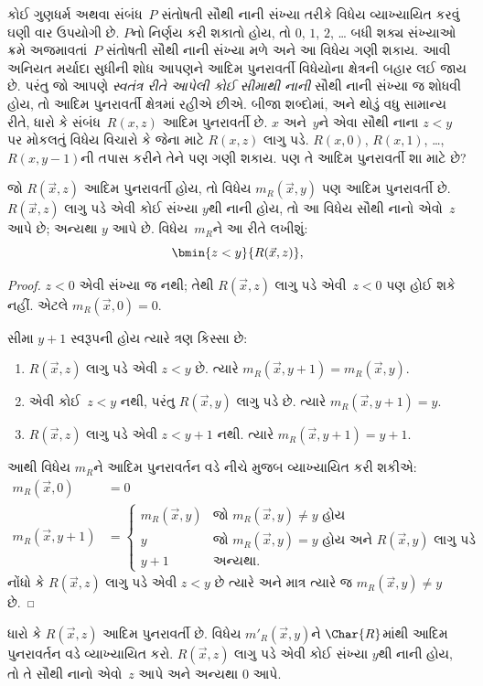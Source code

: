 \documentclass[../../../include/open-logic-section]{subfiles}
\begin{document}

\begin{explain}
કોઈ ગુણધર્મ અથવા સંબંધ~$P$ સંતોષતી સૌથી નાની સંખ્યા તરીકે વિધેય
વ્યાખ્યાયિત કરવું ઘણી વાર ઉપયોગી છે. $P$નો નિર્ણય કરી શકાતો હોય,
તો $0$, $1$, $2$, \dots{} બધી શક્ય સંખ્યાઓ ક્રમે અજમાવતાં~$P$
સંતોષતી સૌથી નાની સંખ્યા મળે અને આ વિધેય ગણી શકાય. આવી અનિયત
મર્યાદા સુધીની શોધ આપણને આદિમ પુનરાવર્તી વિધેયોના ક્ષેત્રની બહાર લઈ
જાય છે. પરંતુ જો આપણે \emph{સ્વતંત્ર રીતે આપેલી કોઈ સીમાથી નાની}
સૌથી નાની સંખ્યા જ શોધવી હોય, તો આદિમ પુનરાવર્તી ક્ષેત્રમાં રહીએ
છીએ. બીજા શબ્દોમાં, અને થોડું વધુ સામાન્ય રીતે, ધારો કે
સંબંધ~$R(x,z)$ આદિમ પુનરાવર્તી છે. $x$ અને~$y$ને એવા સૌથી નાના
$z < y$ પર મોકલતું વિધેય વિચારો કે જેના માટે $R(x, z)$ લાગુ પડે.
$R(x, 0)$, $R(x, 1)$, \dots, $R(x, y-1)$ની તપાસ કરીને તેને પણ
ગણી શકાય. પણ તે આદિમ પુનરાવર્તી શા માટે છે?
\end{explain}

\begin{prop}
જો $R(\vec x, z)$ આદિમ પુનરાવર્તી હોય, તો વિધેય
$m_R(\vec{x}, y)$ પણ આદિમ પુનરાવર્તી છે. $R(\vec x, z)$ લાગુ પડે
એવી કોઈ સંખ્યા $y$થી નાની હોય, તો આ વિધેય સૌથી નાનો એવો~$z$ આપે
છે; અન્યથા $y$ આપે છે. વિધેય~$m_R$ને આ રીતે લખીશું:
\[
\bmin{z < y}{R(\vec{x}, z)},
\]
\end{prop}

\begin{proof}
$z < 0$ એવી સંખ્યા જ નથી; તેથી $R(\vec{x}, z)$ લાગુ પડે
એવી~$z < 0$ પણ હોઈ શકે નહીં. એટલે $m_R(\vec x, 0) = 0$.

સીમા $y + 1$ સ્વરૂપની હોય ત્યારે ત્રણ કિસ્સા છે:
\begin{enumerate}
\item $R(\vec{x}, z)$ લાગુ પડે એવી $z < y$ છે. ત્યારે
$m_R(\vec{x}, y+1) = m_R(\vec{x}, y)$.
\item એવી કોઈ~$z<y$ નથી, પરંતુ $R(\vec{x}, y)$ લાગુ પડે છે.
ત્યારે $m_R(\vec{x}, y+1) = y$.
\item $R(\vec{x}, z)$ લાગુ પડે એવી $z < y+1$ નથી. ત્યારે
$m_R(\vec{x}, y+1) = y+1$.
\end{enumerate}
આથી વિધેય $m_R$ને આદિમ પુનરાવર્તન વડે નીચે મુજબ વ્યાખ્યાયિત
કરી શકીએ:
\begin{align*}
m_R(\vec{x}, 0) & = 0\\
m_R(\vec{x}, y+1) & =
\begin{cases}
m_R(\vec{x}, y) & \text{જો $m_R(\vec x, y) \neq y$ હોય}\\
y & \text{જો $m_R(\vec x, y) = y$ હોય અને $R(\vec{x}, y)$ લાગુ પડે}\\
y+1 & \text{અન્યથા.}
\end{cases}
\end{align*}
નોંધો કે $R(\vec x, z)$ લાગુ પડે એવી $z<y$ છે ત્યારે અને માત્ર
ત્યારે જ $m_R(\vec x,
y) \neq y$ છે.
\end{proof}

\begin{prob}
ધારો કે $R(\vec x, z)$ આદિમ પુનરાવર્તી છે. વિધેય
$m'_R(\vec{x}, y)$ને $\Char{R}$માંથી આદિમ પુનરાવર્તન વડે
વ્યાખ્યાયિત કરો. $R(\vec{x}, z)$ લાગુ પડે એવી કોઈ સંખ્યા $y$થી
નાની હોય, તો તે સૌથી નાનો એવો~$z$ આપે અને અન્યથા $0$ આપે.
\end{prob}
\end{document}
